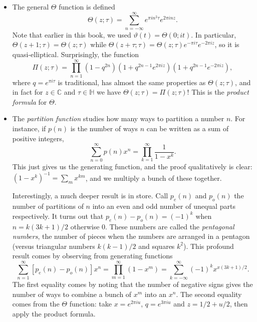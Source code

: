 \documentclass[11pt,
        usenames, %
        dvipsnames %
    ]{report}
\newcommand*{\p}[1]{\left(#1\right)}
\newcommand*{\s}[1]{\left[#1\right]}
\begin{document}
\begin{itemize}
    \item The general $\Theta$ function is defined
        \begin{equation}
            \Theta\p{z ; \tau} = \sum\limits_{n = -\infty}^\infty
                e^{\pi i n^2 \tau}e^{2\pi i n z}.
        \end{equation}
        Note that earlier in this book, we used $\vartheta(t) = \Theta\p{0;
        it}$. In particular, $\Theta\p{z + 1; \tau} = \Theta(z; \tau)$ while
        $\Theta\p{z + \tau; \tau} = \Theta\p{z;\tau}e^{-\pi i \tau} e^{-2\pi i
        z}$, so it is quasi-elliptical. Surprisingly, the function
        \begin{equation}
            \Pi\p{z; \tau} = \prod\limits_{n = 1}^\infty
                \p{1 - q^{2n}}
                \p{1 + q^{2n - 1}e^{2\pi iz}}
                \p{1 + q^{2n - 1}e^{-2\pi iz}},
        \end{equation}
        where $q = e^{\pi i \tau}$ is traditional, has almost the same
        properties as $\Theta(z; \tau)$, and in fact for $z \in \mathbb{C}$ and
        $\tau \in \mathbb{H}$ we have $\Theta\p{z; \tau} = \Pi\p{z; \tau}$! This
        is the \emph{product formula} for $\Theta$.

    \item The \emph{partition function} studies how many ways to partition a
        number $n$. For instance, if $p(n)$ is the number of ways $n$ can be
        written as a sum of positive integers,
        \begin{equation}
            \sum\limits_{n = 0}^\infty p(n) x^n = \prod\limits_{k = 1}^\infty
                \frac{1}{1 - x^k}.
        \end{equation}
        This just gives us the generating function, and the proof qualitatively
        is clear: $(1 - x^k)^{-1} = \sum\limits_m x^{km}$, and we multiply a
        bunch of these together.

        Interestingly, a much deeper result is in store. Call $p_e(n)$ and
        $p_o(n)$ the number of partitions of $n$ into an even and odd number of
        unequal parts respectively. It turns out that $p_{e}(n) - p_{o}(n) =
        \p{-1}^k$ when $n = k(3k + 1) / 2$ otherwise $0$. These numbers are
        called the \emph{pentagonal numbers}, the number of pieces when the
        numbers are arranged in a pentagon (versus triangular numbers $k(k-1)/2$
        and squares $k^2$). This profound result comes by observing from
        generating functions
        \begin{equation}
            \sum\limits_{n = 1}^\infty\s{p_e(n) - p_o(n)}x^n
                = \prod\limits_{m = 1}^\infty \p{1 - x^m}
                = \sum\limits_{k = -\infty}^\infty \p{-1}^k x^{x(3k+1)/2}.
        \end{equation}
        The first equality comes by noting that the number of negative signs
        gives the number of ways to combine a bunch of $x^m$ into an $x^n$. The
        second equality comes from the $\Theta$ function: take $x = e^{2\pi
        iu}$, $q = e^{3\pi iu}$ and $z = 1/2 + u/2$, then apply the product
        formula.


\end{itemize}
\end{document}
